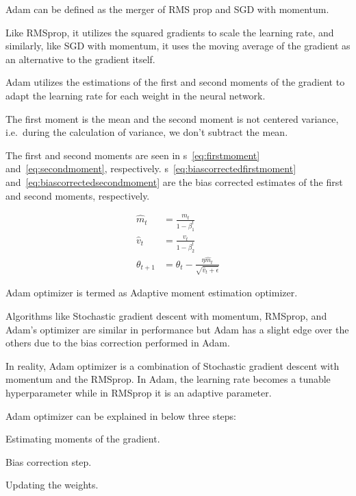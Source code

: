 	\begin{bulletedlist}
		\item Adam can be defined as the merger of RMS prop and SGD with momentum.
		\item Like RMSprop, it utilizes the squared gradients to scale the learning rate, and similarly, like SGD with momentum, it uses the moving average of the gradient as an alternative to the gradient itself.
		\item Adam utilizes the estimations of the first and second moments of the gradient to adapt the learning rate for each weight in the neural network.
		\item The first moment is the mean and the second moment is not centered variance, i.e.\ during the calculation of variance, we don't subtract the mean.
	\end{bulletedlist}

The first and second moments are seen in \equationname{}s~\ref{eq:firstmoment} and~\ref{eq:secondmoment}, respectively.  \equationname{}s~\ref{eq:biascorrectedfirstmoment} and~\ref{eq:biascorrectedsecondmoment} are the bias corrected estimates of the first and second moments, respectively.

	\begin{align}
		\hat{m}_t     &= \frac{m_t}{1-\beta_1^t }    \label{eq:biascorrectedfirstmoment} \\
		\hat{v}_t     &= \frac{v_t}{1-\beta_2^t} \label{eq:biascorrectedsecondmoment}    \\
		\theta_{t+1}  &= \theta_t - \frac{\eta \hat{m}_t}{\sqrt{\hat{v}_t+\epsilon}}
	\end{align}

	\begin{bulletedlist}
		\item Adam optimizer is termed as Adaptive moment estimation optimizer.
		\item Algorithms like Stochastic gradient descent with momentum, RMSprop, and Adam's optimizer are similar in performance but Adam has a slight edge over the others due to the
bias correction performed in Adam.
		\item In reality, Adam optimizer is a combination of Stochastic gradient descent with momentum and the RMSprop.  In Adam, the learning rate becomes a tunable hyperparameter while in RMSprop it is an adaptive parameter.
		\item Adam optimizer can be explained in below three steps:
		\begin{numberedlist}
			\item Estimating moments of the gradient.
			\item Bias correction step.
			\item Updating the weights.
		\end{numberedlist}
	\end{bulletedlist}

